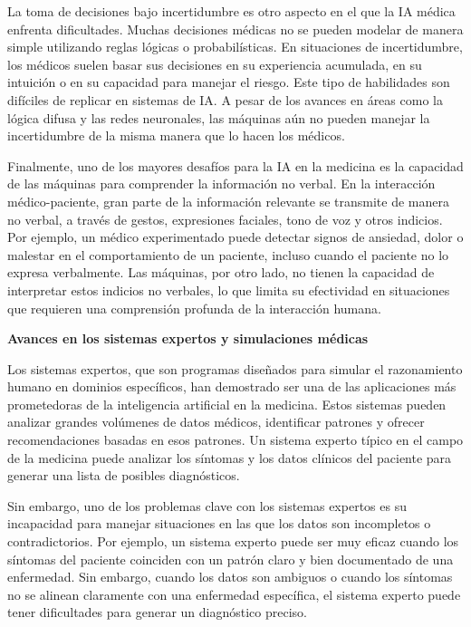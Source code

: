 \documentclass[a4paper,10pt]{article}
\begin{document}
La toma de decisiones bajo incertidumbre es otro aspecto en el que la IA médica enfrenta dificultades. Muchas decisiones médicas no se pueden modelar de manera simple utilizando reglas lógicas o probabilísticas. En situaciones de incertidumbre, los médicos suelen basar sus decisiones en su experiencia acumulada, en su intuición o en su capacidad para manejar el riesgo. Este tipo de habilidades son difíciles de replicar en sistemas de IA. A pesar de los avances en áreas como la lógica difusa y las redes neuronales, las máquinas aún no pueden manejar la incertidumbre de la misma manera que lo hacen los médicos.\vspace{1cm}

Finalmente, uno de los mayores desafíos para la IA en la medicina es la capacidad de las máquinas para comprender la información no verbal. En la interacción médico-paciente, gran parte de la información relevante se transmite de manera no verbal, a través de gestos, expresiones faciales, tono de voz y otros indicios. Por ejemplo, un médico experimentado puede detectar signos de ansiedad, dolor o malestar en el comportamiento de un paciente, incluso cuando el paciente no lo expresa verbalmente. Las máquinas, por otro lado, no tienen la capacidad de interpretar estos indicios no verbales, lo que limita su efectividad en situaciones que requieren una comprensión profunda de la interacción humana.\vspace{1cm}


\textbf{Avances en los sistemas expertos y simulaciones médicas}


Los sistemas expertos, que son programas diseñados para simular el razonamiento humano en dominios específicos, han demostrado ser una de las aplicaciones más prometedoras de la inteligencia artificial en la medicina. Estos sistemas pueden analizar grandes volúmenes de datos médicos, identificar patrones y ofrecer recomendaciones basadas en esos patrones. Un sistema experto típico en el campo de la medicina puede analizar los síntomas y los datos clínicos del paciente para generar una lista de posibles diagnósticos.\vspace{1cm}

Sin embargo, uno de los problemas clave con los sistemas expertos es su incapacidad para manejar situaciones en las que los datos son incompletos o contradictorios. Por ejemplo, un sistema experto puede ser muy eficaz cuando los síntomas del paciente coinciden con un patrón claro y bien documentado de una enfermedad. Sin embargo, cuando los datos son ambiguos o cuando los síntomas no se alinean claramente con una enfermedad específica, el sistema experto puede tener dificultades para generar un diagnóstico preciso.\vspace{1cm}
\end{document}

